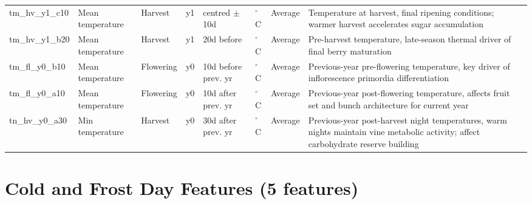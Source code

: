 {\begin{longtable}{p{2.2cm}|p{1.5cm}|p{1.2cm}|p{0.4cm}|p{1.4cm}|p{0.7cm}|p{0.9cm}|p{4.8cm}}
tm\_hv\_y1\_c10 & Mean temperature & Harvest & y1 & centred $\pm$10d & $^\circ$C & Average & Temperature at harvest, final ripening conditions; warmer harvest accelerates sugar accumulation \\
tm\_hv\_y1\_b20 & Mean temperature & Harvest & y1 & 20d before & $^\circ$C & Average & Pre-harvest temperature, late-season thermal driver of final berry maturation \\
tm\_fl\_y0\_b10 & Mean temperature & Flowering & y0 & 10d before prev. yr & $^\circ$C & Average & Previous-year pre-flowering temperature, key driver of inflorescence primordia differentiation \\
tm\_fl\_y0\_a10 & Mean temperature & Flowering & y0 & 10d after prev. yr & $^\circ$C & Average & Previous-year post-flowering temperature, affects fruit set and bunch architecture for current year \\
tn\_hv\_y0\_a30 & Min temperature & Harvest & y0 & 30d after prev. yr & $^\circ$C & Average & Previous-year post-harvest night temperatures, warm nights maintain vine metabolic activity; affect carbohydrate reserve building \\
\end{longtable}
}



\section{Cold and Frost Day Features (5 features)}\label{app_sec:cold_and_frost_day}


